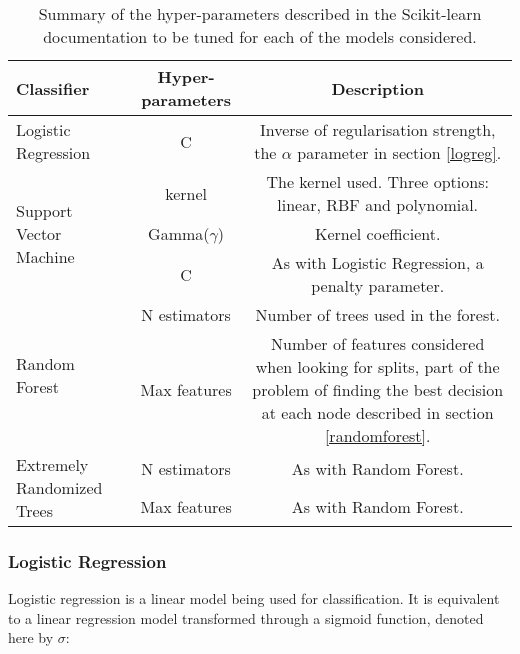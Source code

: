 \begin{table}
    \centering
    \begin{tabular}{l c c}
        Classifier                                  & Hyper-parameters     & Description \\
        \hline
        Logistic Regression                         & C                         &  Inverse of regularisation strength, the $\alpha$ parameter in section \ref{logreg}. \\
        \multirow{3}{*}{Support Vector Machine}     & kernel                    &  The kernel used. Three options: linear, RBF and polynomial. \\
                                                    & Gamma($\gamma$)           &  Kernel coefficient. \\
                                                    & C                         &  As with Logistic Regression, a penalty parameter. \\
        \multirow{2}{*}{Random Forest}              & N estimators              &  Number of trees used in the forest. \\
                                                    & Max features              &  Number of features considered when looking for splits, part of the problem of finding the best decision at each node described in section \ref{randomforest}. \\
        \multirow{2}{*}{Extremely Randomized Trees} & N estimators              &  As with Random Forest. \\
                                                    & Max features              &  As with Random Forest. \\
    \end{tabular}
    \caption{Summary of the hyper-parameters described in the Scikit-learn\cite{pedregosa_scikit-learn:_2011} documentation to be tuned for each of the models considered.}
    \label{tab:hyper}
\end{table}


\subsubsection*{Logistic Regression}
\label{logreg}

Logistic regression is a linear model being used for classification.
It is equivalent to a linear regression model transformed through a sigmoid function\autocite[376]{murphy_machine_2012}, denoted here by $\sigma$:

